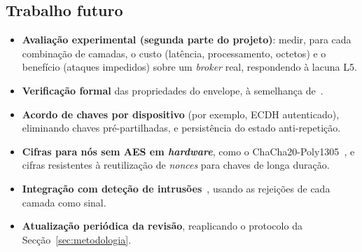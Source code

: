 \subsection{Trabalho futuro}

\begin{itemize}[leftmargin=*]
  \item \textbf{Avaliação experimental (segunda parte do projeto)}: medir, para cada
    combinação de camadas, o custo (latência, processamento, octetos) e o benefício
    (ataques impedidos) sobre um \emph{broker} real, respondendo à lacuna L5.
  \item \textbf{Verificação formal} das propriedades do envelope, à semelhança
    de~\cite{javadi2026cmap}.
  \item \textbf{Acordo de chaves por dispositivo} (por exemplo, ECDH autenticado),
    eliminando chaves pré-partilhadas, e persistência do estado anti-repetição.
  \item \textbf{Cifras para nós sem AES em \emph{hardware}}, como o
    ChaCha20-Poly1305~\cite{rfc8439, sadio2019lightweight}, e cifras resistentes à
    reutilização de \emph{nonces} para chaves de longa duração.
  \item \textbf{Integração com deteção de intrusões}~\cite{vaccari2020mqttset,
    alotaibi2024secure}, usando as rejeições de cada camada como sinal.
  \item \textbf{Atualização periódica da revisão}, reaplicando o protocolo da
    Secção~\ref{sec:metodologia}.
\end{itemize}
